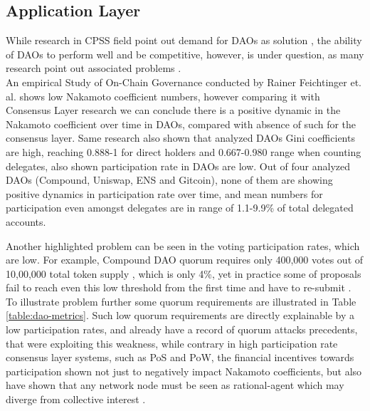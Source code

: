 \documentclass{article}
\begin{document}
\begin{CJK}{UTF8}{gbsn}
\begin{multicols}{2}
\subsection{Application Layer}
While research in CPSS field point out demand for DAOs as solution \cite{Fei2016}\cite{Wang2022}\cite{Juanjuan2023}, the ability of DAOs to perform well and be competitive, however, is under question, as many research point out associated problems \cite{Rainer2023}\cite{Marcella2016}\cite{Xuan2024}.  \\An empirical Study of On-Chain Governance conducted by Rainer Feichtinger et. al. \cite{Rainer2023} shows low Nakamoto coefficient numbers, however comparing it with Consensus Layer research \cite{Dominic2023} we can conclude there is a positive dynamic in the Nakamoto coefficient over time in DAOs, compared with absence of such for the consensus layer. Same research\cite{Rainer2023} also shown that analyzed DAOs Gini coefficients\cite{Lidia2012} are high, reaching 0.888-1 for direct holders and 0.667-0.980 range when counting delegates, also shown participation rate in DAOs are low. Out of four analyzed DAOs (Compound, Uniswap, ENS and Gitcoin), none of them are showing positive dynamics in participation rate over time, and mean numbers for participation even amongst delegates are in range of 1.1-9.9\% of total delegated accounts.


Another highlighted problem can be seen in the voting participation rates, which are low. For example, Compound DAO quorum requires only 400,000 \cite{CompDAO} votes out of 10,00,000 total token supply \cite{CompToken}, which is only 4\%, yet in practice some of proposals fail to reach even this low threshold from the first time and have to re-submit \cite{CompProp232}\cite{CompProp237}. To illustrate problem further some quorum requirements are illustrated in Table \ref*{table:dao-metrics}. Such low quorum requirements are directly explainable by a low participation rates, and already have a record of quorum attacks \cite{AragonBlog}\cite{rhizoo2023} precedents, that were exploiting this weakness, while contrary in high participation rate consensus layer systems, such as PoS and PoW, the financial incentives towards participation shown not just to negatively impact  Nakamoto coefficients, but also have shown that any network node must be seen as rational-agent which may diverge from collective interest \cite{Philip2019}.

\end{multicols}

\begin{multicols}{2}


\end{multicols}
\end{CJK}
\end{document}
